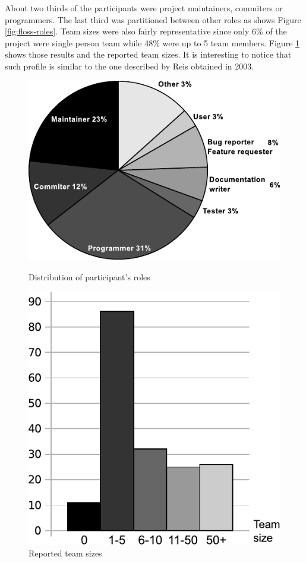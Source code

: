 \documentclass[lnbip]{svmultln}
\begin{document}
About two thirds of the participants were project maintainers,
commiters or programmers. The last third was partitioned between other
roles as shows Figure \ref{fig:floss-roles}. Team sizes were also
fairly representative since only 6\% of the project were single person
team while 48\% were up to 5 team members. Figure
\ref{fig:floss-teams} shows those results and the reported team
sizes. It is interesting to notice that such profile is similar to the
one described by Reis \cite{reis2003} obtained in 2003.

\begin{figure}[htb]
  \begin{minipage}[t]{0.5\linewidth}
    \includegraphics[scale=0.8]{floss-roles.pdf}
    \caption{Distribution of participant's roles}
    \label{fig:floss-roles}
  \end{minipage}
  \begin{minipage}[t]{0.5\linewidth}
    \begin{flushright}
      \includegraphics[scale=0.65]{floss-teams.pdf}
      \caption{Reported team sizes}
      \label{fig:floss-teams}
    \end{flushright}
  \end{minipage}
\end{figure}
\end{document}
